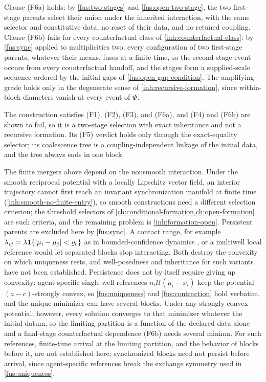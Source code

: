 Clause (F6a) holds: by \cref{fus:two-stages} and \cref{fus:open-two-stage},
the two first-stage parents select their union under the inherited
interaction, with the same selector and constitutive data, no reset of their
data, and no retuned coupling. Clause (F6b) fails for every counterfactual
class of \cref{inh:counterfactual-class}: by \cref{fus:sync} applied to
multiplicities two, every configuration of two first-stage parents, whatever
their means, fuses at a finite time, so the second-stage event occurs from
every counterfactual handoff, and the stages form a supplied-scale sequence
ordered by the initial gaps of \cref{fus:open-gap-condition}. The
amplifying grade holds only in the degenerate sense of
\cref{inh:recursive-formation}, since within-block diameters vanish at every
event of $\Phi$.

The construction satisfies (F1), (F2), (F3), and (F6a), and (F4) and
(F6b) are shown to fail, so it is a two-stage selection with exact
inheritance and not a recursive formation. Its (F5) verdict holds only
through the exact-equality selector; its coalescence tree is a
coupling-independent linkage of the initial data, and the tree always ends in
one block.

The finite mergers above depend on the nonsmooth interaction. Under the
smooth reciprocal potential with a locally Lipschitz vector field, an
interior trajectory cannot first reach an invariant synchronization
manifold at finite time (\cref{inh:smooth-no-finite-entry}), so smooth
constructions need a different selection criterion; the threshold
selectors of \cref{ch:conditional-formation,ch:open-formation} are such
criteria, and the remaining problem is \cref{inh:formation-open}. Persistent
parents are excluded here by \cref{fus:sync}. A contact range, for example
$\lambda_{ij}=\lambda\mathbf 1\{|\mu_i-\mu_j|<\varrho_{\rm c}\}$ as in
bounded-confidence dynamics \cite{HegselmannKrause2002}, or a multiwell local
reference would let separated blocks stop interacting. Both destroy the
convexity on which uniqueness rests, and well-posedness and inheritance for
such variants have not been established. Persistence does not by itself
require giving up convexity: agent-specific single-well references
$n_i\mathcal U(\mu_i-x_i)$ keep the potential $(a-c)$-strongly convex, so
\cref{fus:uniqueness} and \cref{fus:contraction} hold verbatim, and the
unique minimizer can have several blocks. Under any strongly convex
potential, however, every solution converges to that minimizer whatever the
initial datum, so the limiting partition is a function of the declared data
alone and a final-stage counterfactual dependence (F6b) needs several minima.
For such references, finite-time arrival at the limiting partition, and the
behavior of blocks before it, are not established here; synchronized blocks
need not persist before arrival, since agent-specific references break the
exchange symmetry used in \cref{fus:uniqueness}.
